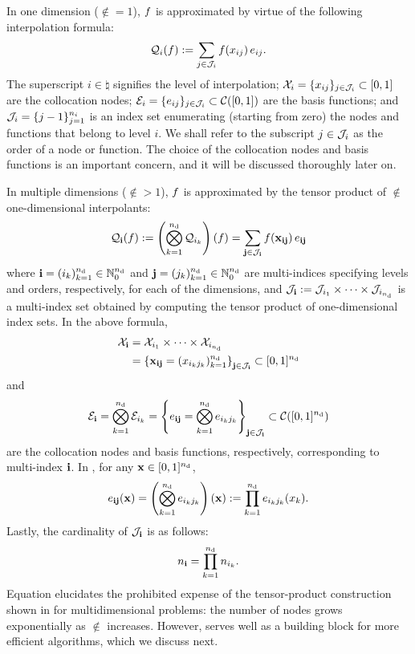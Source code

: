 In one dimension ($\nin = 1$), $f$ is approximated by virtue of the following
interpolation formula:
\begin{equation} \elab{tensor-1d}
  \tensor{i}(\f) := \sum_{j \in \index_i} \f(\x_{ij}) \, \e_{ij}.
\end{equation}
The superscript $i \in \natural$ signifies the level of interpolation; $\mathcal{X}_i =
\{ x_{ij} \}_{j \in \mathcal{J}_i} \subset [0, 1]$ are the collocation nodes; $\mathcal{E}_i
= \{ e_{ij} \}_{j \in \mathcal{J}_i} \subset \mathcal{C}([0, 1])$ are the basis
functions; and $\mathcal{J}_i = \{ j - 1 \}_{j = 1}^{n_i}$ is an index set
enumerating (starting from zero) the nodes and functions that belong to level
$i$. We shall refer to the subscript $j \in \mathcal{J}_i$ as the order of a node or
function. The choice of the collocation nodes and basis functions is an
important concern, and it will be discussed thoroughly later on.

In multiple dimensions ($\nin > 1$), $f$ is approximated by the tensor product
of $\nin$ one-dimensional interpolants:
\begin{equation} \elab{tensor}
  \tensor{\vi}(\f) := \left( \bigotimes_{k = 1}^\nin \tensor{i_k} \right)(\f) = \sum_{\vj \in \index_\vi} \f(\vx_{\vi\vj}) \, \e_{\vi\vj}
\end{equation}
where $\mathbf{i} = (i_k)_{k = 1}^{n_\text{d}} \in \mathbb{N}_0^{n_\text{d}}$ and $\mathbf{j} = (j_k)_{k = 1}^{n_\text{d}}
\in \mathbb{N}_0^{n_\text{d}}$ are multi-indices specifying levels and orders, respectively,
for each of the dimensions, and $\mathcal{J}_{\mathbf{i}} := \mathcal{J}_{i_1} \times \cdots \times
\mathcal{J}_{i_{n_\text{d}}}$ is a multi-index set obtained by computing the tensor product
of one-dimensional index sets. In the above formula,
\begin{align}
  \X_\vi &= \X_{i_1} \times \cdots \times \X_{i_\nin} \elab{collocation-nodes} \\
         &= \left\{ \vx_{\vi\vj} = (\x_{i_k j_k})_{k = 1}^\nin \right\}_{\vj \in \index_\vi} \subset [0, 1]^\nin \nonumber
\end{align}
and
\begin{equation} \elab{basis-functions}
  \E_\vi = \bigotimes_{k = 1}^\nin \E_{i_k}
         = \left\{ \e_{\vi\vj} = \bigotimes_{k = 1}^\nin \e_{i_k j_k} \right\}_{\vj \in \index_\vi} \subset \continuous([0, 1]^\nin)
\end{equation}
are the collocation nodes and basis functions, respectively, corresponding to
multi-index $\mathbf{i}$. In , for any $\mathbf{x} \in [0, 1]^{n_\text{d}}$,
\begin{equation} \elab{basis-function}
  \e_{\vi\vj}(\vx) = \left( \bigotimes_{k = 1}^\nin \e_{i_k j_k} \right)(\vx) := \prod_{k = 1}^\nin \e_{i_k j_k}(\x_k).
\end{equation}
Lastly, the cardinality of $\mathcal{J}_{\mathbf{i}}$ is as follows:
\begin{equation} \elab{tensor-cardinality}
  \n_\vi = \prod_{k = 1}^\nin \n_{i_k}.
\end{equation}
Equation  elucidates the prohibited expense of the
tensor-product construction shown in  for multidimensional
problems: the number of nodes grows exponentially as $\nin$ increases. However,
 serves well as a building block for more efficient algorithms,
which we discuss next.

